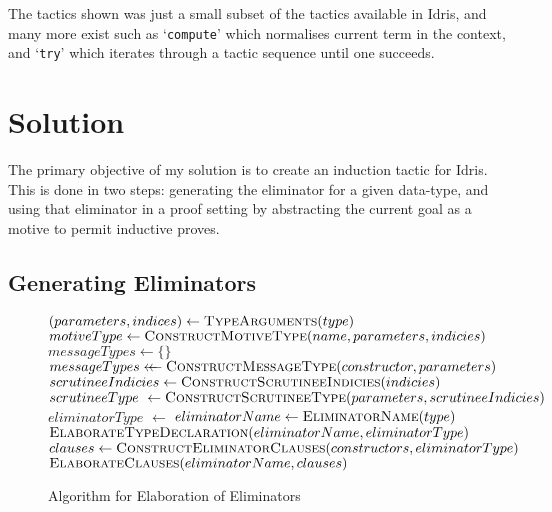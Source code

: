 \documentclass[a4paper]{article}%
\begin{document}
The tactics shown was just a small subset of the tactics available in Idris, and many more exist such as `\texttt{compute}' which normalises current term in the context, and `\texttt{try}' which iterates through a tactic sequence until one succeeds.

\section{Solution}
\label{sec:Solution}
The primary objective of my solution is to create an induction tactic for Idris. This is done in two steps: generating the eliminator for a given data-type, and using that eliminator in a proof setting by abstracting the current goal
as a motive to permit inductive proves.

\subsection{Generating Eliminators}
\label{sub:GeneratingEliminators}

\begin{figure}[H]
  \begin{center}
    \begin{algorithmic}[1]
    \State $\left(parameters, indices\right) \gets \Call{TypeArguments}{type}$
    \State $motiveType \gets \Call{ConstructMotiveType}{name, parameters, indicies}$
    \State $messageTypes \gets \{\}$
    \State $messageTypes \mathrel{\leftarrow\mkern-12mu\leftarrow} \Call{ConstructMessageType}{constructor, parameters}$
    \EndFor
    \State $scrutineeIndicies \gets \Call{ConstructScrutineeIndicies}{indicies}$
    \State $scrutineeType \gets \Call{ConstructScrutineeType}{parameters, scrutineeIndicies}$
    \State $eliminatorType$ $\gets$ 
    \State $eliminatorName \gets \Call{EliminatorName}{type}$
    \State $\Call{ElaborateTypeDeclaration}{eliminatorName, eliminatorType}$
      \State $clauses \gets \Call{ConstructEliminatorClauses}{constructors, eliminatorType}$
      \State $\Call{ElaborateClauses}{eliminatorName, clauses}$
    \EndIf
    \EndProcedure
  \end{algorithmic}
  \end{center}
\caption{Algorithm for Elaboration of Eliminators}
\label{fig:elabelim}
\end{figure}
\end{document}
